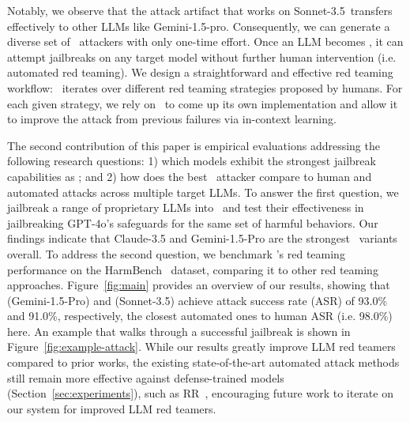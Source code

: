 Notably, we observe that the attack artifact that works on Sonnet-3.5~transfers effectively to other LLMs like Gemini-1.5-pro. Consequently, we can generate a diverse set of \methodname~attackers with only one-time effort. Once an LLM becomes \methodname, it can attempt jailbreaks on any target model without further human intervention (i.e. automated red teaming). We design a straightforward and effective red teaming workflow: \methodname~iterates over different red teaming strategies proposed by humans. For each given strategy, we rely on \methodname~to come up its own implementation and allow it to improve the attack from previous failures via in-context learning.

The second contribution of this paper is empirical evaluations addressing the following research questions: 1) which models exhibit the strongest jailbreak capabilities as \methodname; and 2) how does the best \methodname~attacker compare to human and automated attacks across multiple target LLMs. To answer the first question, we jailbreak a range of proprietary LLMs into \methodname~and test their effectiveness in jailbreaking GPT-4o's safeguards for the same set of harmful behaviors. Our findings indicate that Claude-3.5 and Gemini-1.5-Pro are the strongest \methodname~variants overall. To address the second question, we benchmark \methodname's red teaming performance on the HarmBench~\citep{mazeika2024harmbench} dataset, comparing it to other red teaming approaches. Figure~\ref{fig:main} provides an overview of our results, showing that \methodname(Gemini-1.5-Pro) and \methodname(Sonnet-3.5) achieve attack success rate (ASR) of 93.0\% and 91.0\%, respectively, the closest automated ones to human ASR (i.e. 98.0\%) here. An example that walks through a successful jailbreak is shown in Figure~\ref{fig:example-attack}.
While our results greatly improve LLM red teamers compared to prior works, the existing state-of-the-art automated attack methods still remain more effective against defense-trained models (Section~\ref{sec:experiments}), such as RR~\citep{zou2024improvingalignmentrobustnesscircuit}, encouraging future work to iterate on our system for improved LLM red teamers. 


